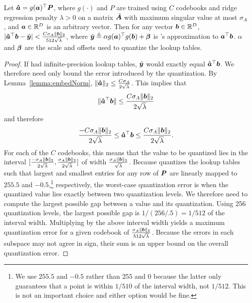 \begin{lemma} \label{lemma:lutQuantBound}
Let $\ahat = g(\a)^\top\P$, where $g(\cdot)$ and $P$ are trained using $C$ codebooks and ridge regression penalty $\lambda > 0$ on a matrix $\tilde{\A}$ with maximum singular value at most $\sigma_A$, and $\a \in \R^D$ is an arbitrary vector. Then for any vector $\b \in \R^D$, $|\ahat^\top \b - \yhat| < \frac{C \sigma_A \norm{\b}_2}{512 \sqrt{\lambda}} $, where %
$\yhat \triangleq \alpha g(\a)^\top g(\b) + \mat{\beta}$ is \ours's approximation to $\a^\top \b$. $\alpha$ and $\mat{\beta}$ are the scale and offsets used to quantize the lookup tables.
\end{lemma}
\begin{proof} If \oursp had infinite-precision lookup tables, $\yhat$ would exactly equal $\ahat^\top \b$. We therefore need only bound the error introduced by the quantization. By Lemma~\ref{lemma:embedNorm}, $\norm{\ahat}_2 \le \frac{C \sigma_A}{2 \sqrt{\lambda}} $. This implies that
\begin{align}
    \norm{\ahat^\top \b} \le \frac{C \sigma_A \norm{\b}_2}{2 \sqrt{\lambda}}
\end{align}
and therefore
\begin{align}
    \frac{-C \sigma_A \norm{\b}_2}{2 \sqrt{\lambda}} \le \ahat^\top \b \le \frac{C \sigma_A \norm{\b}_2}{2 \sqrt{\lambda}}.
\end{align}
For each of the $C$ codebooks, this means that the value to be quantized lies in the interval $[\frac{-\sigma_A \norm{\b}_2}{2 \sqrt{\lambda}}, \frac{\sigma_A \norm{\b}_2}{2 \sqrt{\lambda}}]$ of width $\frac{\sigma_A \norm{\b}_2}{\sqrt{\lambda}}$.
Because \oursp quantizes the lookup tables such that largest and smallest entries for any row of $\P$ are linearly mapped to $255.5$ and $-0.5$,\footnote{We use $255.5$ and $-0.5$ rather than $255$ and $0$ because the latter only guarantees that a point is within $1 / 510$ of the interval width, not $1 / 512$. This is not an important choice and either option would be fine.} respectively, the worst-case quantization error is when the quantized value lies exactly between two quantization levels. %
We therefore need to compute the largest possible gap between a value and its quantization. Using 256 quantization levels, the largest possible gap is $1 / (256 / .5) = 1/512$ of the interval width. Multiplying by the above interval width yields a maximum quantization error for a given codebook of $\frac{\sigma_A \norm{\b}_2}{512 \sqrt{\lambda}}$.
Because the errors in each subspace may not agree in sign, their sum is an upper bound on the overall quantization error.
\end{proof}

